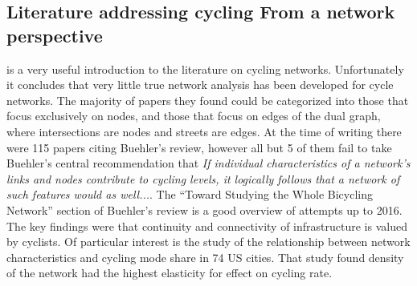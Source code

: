 \documentclass[11pt]{article} %
\begin{document}
%
%
%
%
%
%
%
%
%


\subsection{Literature addressing cycling From a network perspective}


\cite{buehler2016bikeway} is a very useful introduction to the literature on cycling networks. Unfortunately it concludes that very little true network analysis has been developed for cycle networks. The majority of papers they found could be categorized into those that focus exclusively on nodes, and those that focus on edges of the dual graph, where intersections are nodes and streets are edges. At the time of writing there were 115 papers citing Buehler's review, however all but 5 of them fail to take Buehler's central recommendation that \textit{If individual characteristics of a network's links and nodes contribute to cycling levels, it logically follows that a network of such features would as well...}. The ``Toward Studying the Whole Bicycling Network'' section of Buehler's review is a good overview of attempts up to 2016. The key findings were that continuity and connectivity of infrastructure is valued by cyclists. Of particular interest is the \cite{schoner2014missing} study of the relationship between network characteristics and cycling mode share in 74 US cities. That study found density of the network had the highest elasticity for effect on cycling rate. 
\end{document}
